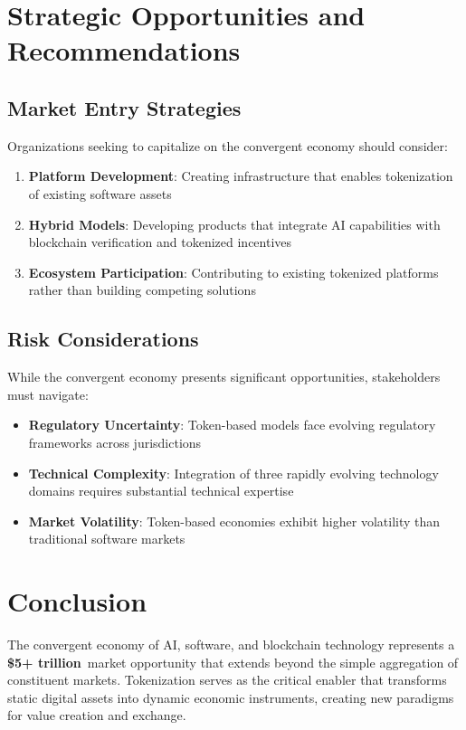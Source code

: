 \documentclass[11pt]{article}
\newcommand{\marketvalue}[2]{\textcolor{accentgreen}{\textbf{\$#1}}\,\textcolor{darkgray}{#2}}
\begin{document}
\section{Strategic Opportunities and Recommendations}

\subsection{Market Entry Strategies}

Organizations seeking to capitalize on the convergent economy should consider:

\begin{enumerate}
\item \textbf{Platform Development}: Creating infrastructure that enables tokenization of existing software assets
\item \textbf{Hybrid Models}: Developing products that integrate AI capabilities with blockchain verification and tokenized incentives
\item \textbf{Ecosystem Participation}: Contributing to existing tokenized platforms rather than building competing solutions
\end{enumerate}

\subsection{Risk Considerations}

While the convergent economy presents significant opportunities, stakeholders must navigate:

\begin{itemize}
\item \textbf{Regulatory Uncertainty}: Token-based models face evolving regulatory frameworks across jurisdictions
\item \textbf{Technical Complexity}: Integration of three rapidly evolving technology domains requires substantial technical expertise
\item \textbf{Market Volatility}: Token-based economies exhibit higher volatility than traditional software markets
\end{itemize}

\section{Conclusion}

The convergent economy of AI, software, and blockchain technology represents a \marketvalue{5+ trillion}{} market opportunity that extends beyond the simple aggregation of constituent markets. Tokenization serves as the critical enabler that transforms static digital assets into dynamic economic instruments, creating new paradigms for value creation and exchange.
\end{document}
